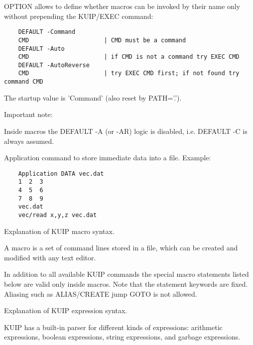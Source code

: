   \par
OPTION allows to define whether macros can be invoked by their name only 
   without prepending the KUIP/EXEC command:  
\begin{verbatim}
    DEFAULT -Command
    CMD                     | CMD must be a command
    DEFAULT -Auto
    CMD                     | if CMD is not a command try EXEC CMD
    DEFAULT -AutoReverse
    CMD                     | try EXEC CMD first; if not found try command CMD
\end{verbatim}
   \par
The startup value is 'Command' (also reset by PATH='.').  

   \par
Important note:  

   \par
Inside macros the DEFAULT -A (or -AR) logic is disabled, i.e.  DEFAULT -C 
   is always assumed.  

\ENDCMD


   \par
Application command to store immediate data into a file.  Example:  
\begin{verbatim}
    Application DATA vec.dat
    1  2  3
    4  5  6
    7  8  9
    vec.dat
    vec/read x,y,z vec.dat
\end{verbatim}

\ENDCMD
{}
\ifMENUtext
   \par
Explanation of KUIP macro syntax.  

   \par
A macro is a set of command lines stored in a file, which can be created 
   and modified with any text editor.  

   \par
In addition to all available KUIP commands the  special \DQUOTE{}macro 
   statements\DQUOTE{} listed below are valid only inside macros. Note that 
   the statement keywords are fixed. Aliasing such as \DQUOTE{}ALIAS/CREATE 
   jump GOTO\DQUOTE{} is not allowed.  


\fi
{}
\ifMENUtext
   \par
Explanation of KUIP expression syntax.  

   \par
KUIP has a built-in parser for different kinds of expressions: arithmetic 
   expressions, boolean expressions, string expressions, and \DQUOTE{}garbage 
   expressions\DQUOTE{}.  


